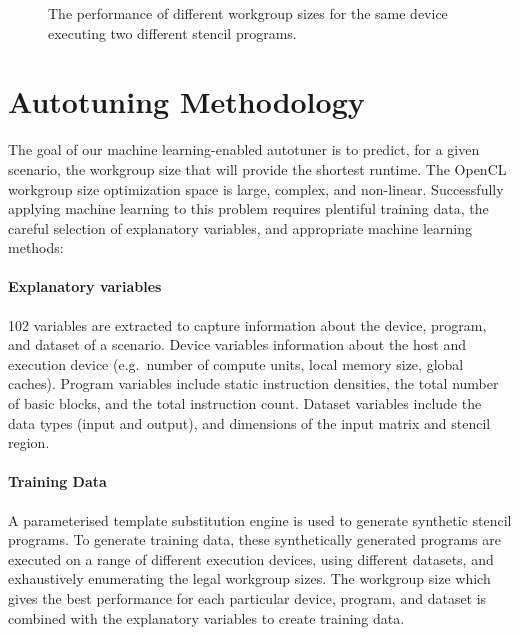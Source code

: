 \documentclass[hidelinks]{acaces}
\DeclareMathOperator*{\argmin}{arg\,min}
\begin{document}
\begin{figure}
{\begin{minipage}{.48\textwidth}
\begin{subfigure}[h]{.48\columnwidth}
      \vspace{-1.5em} %
      \caption{}
      \label{fig:motivation-4}
    \end{subfigure}
    \caption{%
      The performance of different workgroup sizes for the same device
      executing two different stencil programs.%
    }
    \label{fig:motivation-prog}
  \end{minipage}%
}
\end{figure}


\section{Autotuning Methodology}

The goal of our machine learning-enabled autotuner is to predict, for
a given scenario, the workgroup size that will provide the shortest
runtime.
%
The OpenCL workgroup size optimization space is large, complex, and
non-linear. Successfully applying machine learning to this problem
requires plentiful training data, the careful selection of explanatory
variables, and appropriate machine learning methods:
%
\vspace{-1.2em}
\paragraph{Explanatory variables} 102 variables are extracted to
capture information about the device, program, and dataset of a
scenario. Device variables information about the host and execution
device (e.g.\ number of compute units, local memory size, global
caches). Program variables include static instruction densities, the
total number of basic blocks, and the total instruction count. Dataset
variables include the data types (input and output), and dimensions of
the input matrix and stencil region.
%
\vspace{-1.2em}
\paragraph{Training Data} A parameterised template substitution engine
is used to generate synthetic stencil programs. To generate training
data, these synthetically generated programs are executed on a range
of different execution devices, using different datasets, and
exhaustively enumerating the legal workgroup sizes. The workgroup size
which gives the best performance for each particular device, program,
and dataset is combined with the explanatory variables to create
training data.
%
\vspace{-1.2em}
\end{document}
